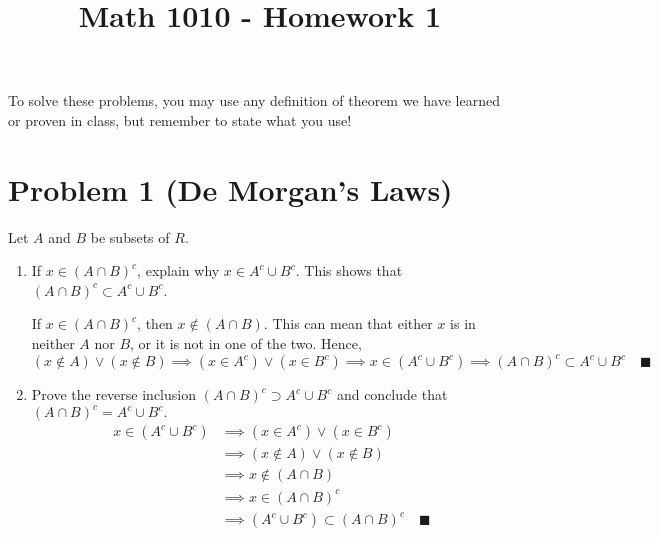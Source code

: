 \documentclass[12pt]{article}
\title{Math 1010 - Homework 1}
\author{}
\date{}
\newcommand{\qed}{\quad \blacksquare}
\begin{document}
\maketitle
\vspace*{-1in}
To solve these problems, you may use any definition of theorem we have learned or proven in class, but
remember to state what you use!

\section*{Problem 1 (De Morgan's Laws)} 
    Let $A$ and $B$ be subsets of $R$.
    \begin{enumerate}
        \item If $x \in (A \cap B)^c$, explain why $x \in A^c \cup B^c$. This shows that $(A \cap B)^c \subset A^c \cup B^c$.
        
            \color{blue}
                If $x \in (A\cap B)^c$, then $x \notin (A \cap B)$. This can mean that either $x$ is in neither $A$ nor $B$, or it is not in one of the two. Hence, 
                \[(x \notin A) \lor (x \notin B) \implies (x \in A^c) \lor (x \in B^c) \implies x \in (A^c \cup B^c) \implies (A \cap B)^c \subset A^c \cup B^c \qed\]
            \color{black}

        \item Prove the reverse inclusion $(A \cap B)^c \supset A^c \cup B^c$ and conclude that $(A \cap B)^c = A^c \cup B^c.$
            \color{blue}
                \begin{align*}
                    x \in (A^c \cup B^c) &\implies (x \in A^c) \lor (x \in B^c) \\ 
                        &\implies (x \notin A) \lor (x \notin B)\\  
                        & \implies x \notin (A \cap B)\\ 
                        &\implies x \in (A \cap B)^c \\ 
                        &\implies (A^c \cup B^c) \subset (A \cap B)^c \qed
                \end{align*}
            \color{black}


\end{enumerate}
\end{document}
